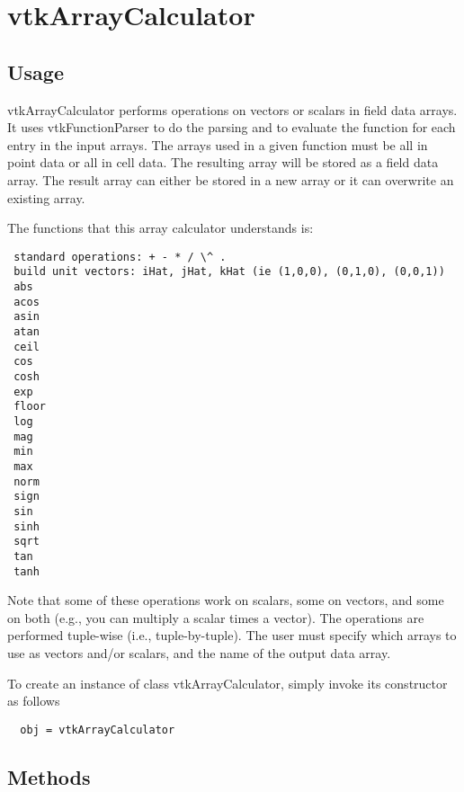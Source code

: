 \section{vtkArrayCalculator}

\subsection{Usage}

 vtkArrayCalculator performs operations on vectors or scalars in field
 data arrays.  It uses vtkFunctionParser to do the parsing and to
 evaluate the function for each entry in the input arrays.  The arrays
 used in a given function must be all in point data or all in cell data.
 The resulting array will be stored as a field data array.  The result
 array can either be stored in a new array or it can overwrite an existing
 array.

 The functions that this array calculator understands is:
 \begin{verbatim}
 standard operations: + - * / \^ .
 build unit vectors: iHat, jHat, kHat (ie (1,0,0), (0,1,0), (0,0,1))
 abs
 acos
 asin
 atan
 ceil
 cos
 cosh
 exp
 floor
 log
 mag
 min
 max
 norm
 sign
 sin
 sinh
 sqrt
 tan
 tanh
 \end{verbatim}
 Note that some of these operations work on scalars, some on vectors, and some on
 both (e.g., you can multiply a scalar times a vector). The operations are performed
 tuple-wise (i.e., tuple-by-tuple). The user must specify which arrays to use as
 vectors and/or scalars, and the name of the output data array.


To create an instance of class vtkArrayCalculator, simply
invoke its constructor as follows
\begin{verbatim}
  obj = vtkArrayCalculator
\end{verbatim}
\subsection{Methods}

